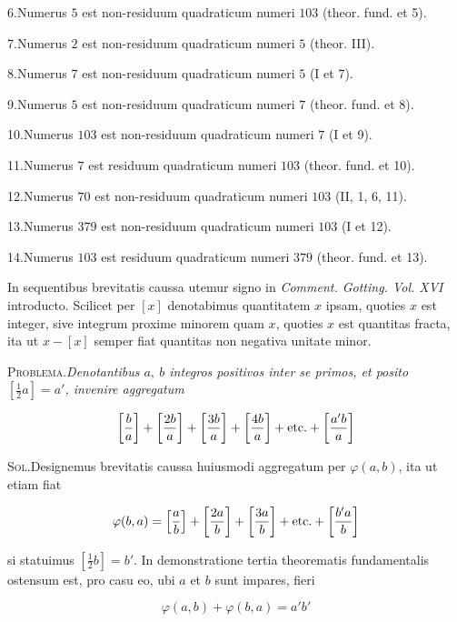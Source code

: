 %
6.\quad Numerus $5$ est non-residuum quadraticum numeri $103$ (theor. fund. et 5).

7.\quad Numerus $2$ est non-residuum quadraticum numeri $5$ (theor. III).

8.\quad Numerus $7$ est non-residuum quadraticum numeri $5$ (I et 7).

9.\quad Numerus $5$ est non-residuum quadraticum numeri $7$ (theor. fund. et 8).

10.\quad Numerus $103$ est non-residuum quadraticum numeri $7$ (I et 9).

11.\quad Numerus $7$ est residuum quadraticum numeri $103$ (theor. fund. et 10).

12.\quad Numerus $70$ est non-residuum quadraticum numeri $103$ (II, 1, 6, 11).

13.\quad Numerus $379$ est non-residuum quadraticum numeri $103$ (I et 12).

14.\quad Numerus $103$ est residuum quadraticum numeri $379$ (theor. fund. et 13).

In sequentibus brevitatis caussa utemur signo in \textit{Comment. Gotting. Vol. XVI} introducto. Scilicet per $[x]$ denotabimus quantitatem $x$ ipsam, quoties $x$ est integer, sive integrum proxime minorem quam $x$, quoties $x$ est quantitas fracta, ita ut $x-[x]$ semper fiat quantitas non negativa unitate minor.


\textsc{Problema.}\quad \textit{Denotantibus $a,\ b$ integros positivos inter se primos, et posito $[\frac12a]=a'$, invenire aggregatum}

\[
\left[\frac ba\right]+\left[\frac{2b}a\right]+\left[\frac{3b}a\right]+\left[\frac{4b}a\right]+\text{etc.}+\left[\frac{a'b}a\right]
\]

\textsc{Sol.}\quad Designemus brevitatis caussa huiusmodi aggregatum per $\varphi(a,b)$, ita ut etiam fiat

\[
\varphi(b,a)=\left[\frac ab\right]+\left[\frac{2a}b\right]+\left[\frac{3a}b\right]+\text{etc.}+\left[\frac{b'a}b\right]
\]

si statuimus $[\frac12b]=b'$. In demonstratione tertia theorematis fundamentalis ostensum est, pro casu eo, ubi $a$ et $b$ sunt impares, fieri

\[
\varphi(a,b)+\varphi(b,a)=a'b'
\]

